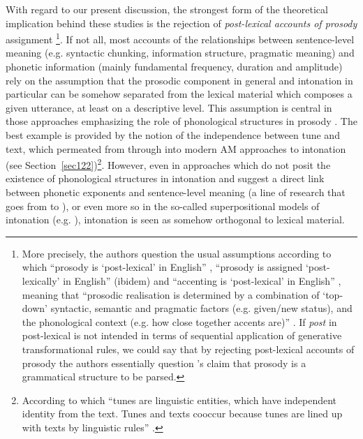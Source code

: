 With regard to our present discussion, the strongest form of the theoretical implication behind these studies is the rejection of \textit{post-lexical accounts of prosody} assignment \citep{schweitzer2010relative,schweitzer2011prosodic}\footnote{More precisely, the authors question the usual assumptions according to which ``prosody is `post-lexical' in English'' \citep[1]{schweitzer2011prosodic}, ``prosody is assigned `post-lexically' in English'' (ibidem) and ``accenting is `post-lexical' in English'' \citep[1]{schweitzer2010relative}, meaning that ``prosodic realisation is determined
by a combination of `top-down' syntactic, semantic and pragmatic factors (e.g. given/new status), and the phonological context (e.g. how close together accents are)'' \citep[4]{schweitzer2011prosodic}. If \textit{post} in post-lexical is not intended in terms of sequential application of generative transformational rules, we could say that by rejecting post-lexical accounts of prosody the authors essentially question \citeauthor{beckman1996parsing}'s \citeyear{beckman1996parsing} claim that prosody is a grammatical structure to be parsed.}. If not all, most accounts of the relationships between sentence-level meaning (e.g. syntactic chunking, information structure, pragmatic meaning) and phonetic information (mainly fundamental frequency, duration and amplitude) rely on the assumption that the prosodic component in general and intonation in particular can be somehow separated from the lexical material which composes a given utterance, at least on a descriptive level. This assumption is central in those approaches emphasizing the role of phonological structures in prosody \citep{ladd2008intonational}. The best example is provided by the notion of the independence between tune and text, which permeated from \citet{liberman1979intonational} through \citet{pierrehumbert1980phonology} into modern AM approaches to intonation (see Section~\ref{sec122})\footnote{According to which ``tunes are linguistic entities, which have independent identity from the text. Tunes and texts cooccur because tunes are lined up with texts by linguistic rules'' \citep[19]{pierrehumbert1980phonology}.}. However, even in approaches which do not posit the existence of phonological structures in intonation and suggest a direct link between phonetic exponents and sentence-level meaning (a line of research that goes from \citealt{cooper1980syntax} to \citealt{xu2005speech}), or even more so in the so-called superpositional models of intonation (e.g. \citealt{fujisaki1982modelling}), intonation is seen as somehow orthogonal to lexical material. 

